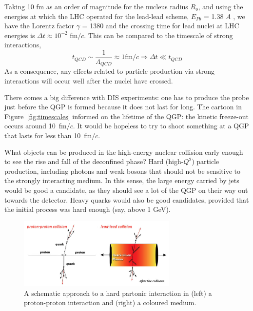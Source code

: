 Taking 10 fm as an order of magnitude for the nucleus radius $R_{o}$,
and using the energies at which the LHC operated for the lead-lead scheme,
$E_{Pb}$ = 1.38 $A$ \TeV, we have the Lorentz factor $\gamma$ = 1380
and the crossing time for lead nuclei at LHC energies is $\Delta t
\approx 10^{-2}$ fm$/c$. This can be compared to the timescale
of strong interactions,
\begin{equation}
t_{QCD} \sim \frac{1}{\Lambda_{QCD}} \approx 1 \textrm{fm}/c
\Longrightarrow \Delta t \ll t_{QCD}
\end{equation}
As a consequence, any effects related to particle production via
strong interactions will occur well after the nuclei have crossed.

There comes a big difference with DIS experiments: one has to produce
the probe just before the QGP is formed because it does not last for
long. The cartoon in Figure~\ref{fig:timescales} informed on
the lifetime of the QGP: the kinetic freeze-out occurs around
10~fm$/c$. It would be hopeless to try to shoot something at a QGP
that lasts for less than 10~fm$/c$.

What objects can be produced in the high-energy nuclear collision
early enough to see the rise and fall of the deconfined phase? Hard
(high-$Q^{2}$)
particle production, including photons and weak bosons that should not be sensitive to the strongly interacting medium. In this sense, the large
energy carried by jets would be good a candidate, as they should see a lot
of the QGP on their way out towards the detector. Heavy quarks would
also be good candidates, 
provided that the initial process was hard enough (say, above 1 GeV).

\begin{figure}[h]
\begin{center}
  \includegraphics[width=0.7\textwidth]{Chapters/pQCD/collisions.jpg}
 \caption{A schematic approach to a hard partonic interaction in
   (left) a proton-proton interaction and (right) a coloured medium.}
 \label{fig:collision}
\end{center}
\end{figure}


